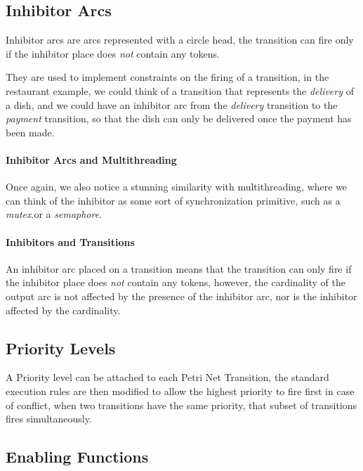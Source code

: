 \documentclass[openright, twoside, twocolumn]{report}
\begin{document}

    \subsection{Inhibitor Arcs}
    Inhibitor arcs are arcs represented with a circle head, the transition can fire only if the inhibitor place
    does \emph{not} contain any tokens.

    They are used to implement constraints on the firing of a transition, in the restaurant example, we
    could think of a transition that represents the \emph{delivery} of a dish, and we could have an inhibitor
    arc from the \emph{delivery} transition to the \emph{payment} transition, so that the dish can only be
    delivered once the payment has been made.


    \paragraph{Inhibitor Arcs and Multithreading}
    Once again, we also notice a stunning similarity with multithreading, where we can think of the inhibitor
    as some sort of synchronization primitive, such as a \emph{mutex}.or a \emph{semaphore}.

    \paragraph{Inhibitors and Transitions}
    An inhibitor arc placed on a transition means that the transition can only fire if the inhibitor place
    does \emph{not} contain any tokens, however, the cardinality of the output arc is not affected by the
    presence of the inhibitor arc, nor is the inhibitor affected by the cardinality.

    \subsection{Priority Levels}

    A Priority level can be attached to each Petri Net Transition, the standard execution rules are then modified
    to allow the highest priority to fire first in case of conflict, when two transitions have the same priority,
    that subset of transitions fires simultaneously.

    \subsection{Enabling Functions}
\end{document}
